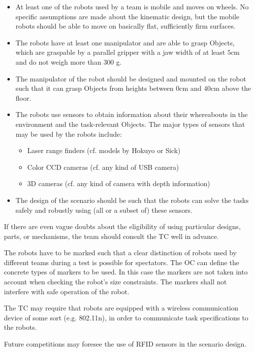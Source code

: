 \begin{itemize}

	\item At least one of the robots used by a team is mobile and moves on wheels. No specific assumptions are made about the kinematic design, but the mobile robots should be able to move on basically flat, sufficiently firm surfaces.
	\item The robots have at least one manipulator and are able to grasp Objects, which are graspable by a parallel gripper with a jaw width of at least $5\si{\centi\meter}$ and do not weigh more than 300 g.
	\item The manipulator of the robot should be designed and mounted on the robot such that it can grasp Objects from heights between $0\si{\centi\meter}$ and $40\si{\centi\meter}$ above the floor.
	\item The robots use sensors to obtain information about their whereabouts in the environment and the task-relevant Objects. The major types of sensors that may be used by the robots include:
	\begin{itemize}
		\item Laser range finders (cf. models by Hokuyo or Sick)
		\item Color CCD cameras (cf. any kind of USB camera)
		\item 3D cameras (cf. any kind of camera with depth information)
	\end{itemize}
	\item The design of the scenario should be such that the robots can solve the tasks safely and robustly using (all or a subset of) these sensors.

\end{itemize}

\par
If there are even vague doubts about the eligibility of using particular designs, parts, or mechanisms, the team should consult the TC well in advance.
\par
The robots have to be marked such that a clear distinction of robots used by different teams during a test is possible for spectators. The OC can define the concrete types of markers to be used. In this case the markers are not taken into account when checking the robot's size constraints. The markers shall not interfere with safe operation of the robot.
\par
The TC may require that robots are equipped with a wireless communication device of some sort (e.g. 802.11n), in order to communicate task specifications to the robots.
\par
Future competitions may foresee the use of RFID sensors in the scenario design.


